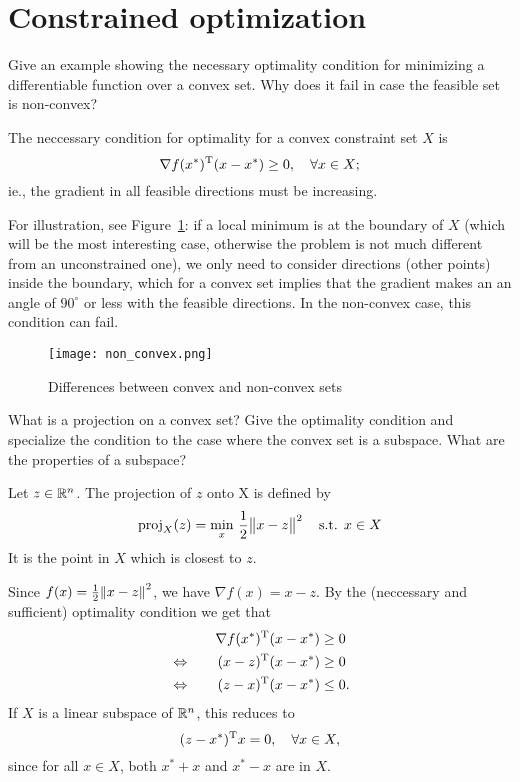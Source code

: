 \documentclass{article}
\begin{document}
\section{Constrained optimization}

\begin{question}
  Give an example showing the necessary optimality condition for minimizing a differentiable
  function over a convex set. Why does it fail in case the feasible set is non-convex?
\end{question}

The neccessary condition for optimality for a convex constraint set \(X\) is
\begin{equation*}
  \nabla f(x^*)^{\mathrm{T}}(x - x^*) \geq 0, \quad\forall x \in X;
\end{equation*}
ie., the gradient in all feasible directions must be increasing. 

For illustration, see Figure~\ref{fig:non-convex}: if a local minimum is at the boundary of \(X\) (which
will be the most interesting case, otherwise the problem is not much different from an unconstrained
one), we only need to consider directions (other points) inside the boundary, which for a convex set
implies that the gradient makes an an angle of \(90^\circ\) or less with the feasible directions.
In the non-convex case, this condition can fail.

\begin{figure}[H]
  \centering
  \texttt{[image: non\_convex.png]}
  \caption{Differences between convex and non-convex sets\label{fig:non-convex}}
\end{figure}

\begin{question}
  What is a projection on a convex set? Give the optimality condition and specialize the condition
  to the case where the convex set is a subspace.  What are the properties of a subspace?
\end{question}

Let \(z \in \mathbb{R}^n\).  The projection of \(z\) onto X is defined by
\begin{equation*}
  \proj_X(z) = \min_{x}\, \frac{1}{2}\enVert[1]{x - z}^2 \quad\text{s.t. } x \in X
\end{equation*}
It is the point in \(X\) which is closest to \(z\). 

Since \(f(x) = \frac{1}{2} \enVert{x - z}^2\), we have \(\nabla f(x) = x - z\).  By the (neccessary
and sufficient) optimality condition we get that
\begin{alignat*}{2}
  &\quad & \nabla f(x^*)^{\mathrm{T}}(x - x^*) &\geq 0 \\
  &\Leftrightarrow\quad & (x - z)^{\mathrm{T}}(x - x^*) &\geq 0 \\
  &\Leftrightarrow\quad & (z - x)^{\mathrm{T}}(x - x^*) &\leq 0.
\end{alignat*}
If \(X\) is a linear subspace of \(\mathbb{R}^n\), this reduces to
\begin{equation*}
  (z - x^*)^{\mathrm{T}}x = 0, \quad\forall x \in X,
\end{equation*}
since for all \(x \in X\), both \(x^* + x\) and \(x^* - x\) are in \(X\).
\end{document}
